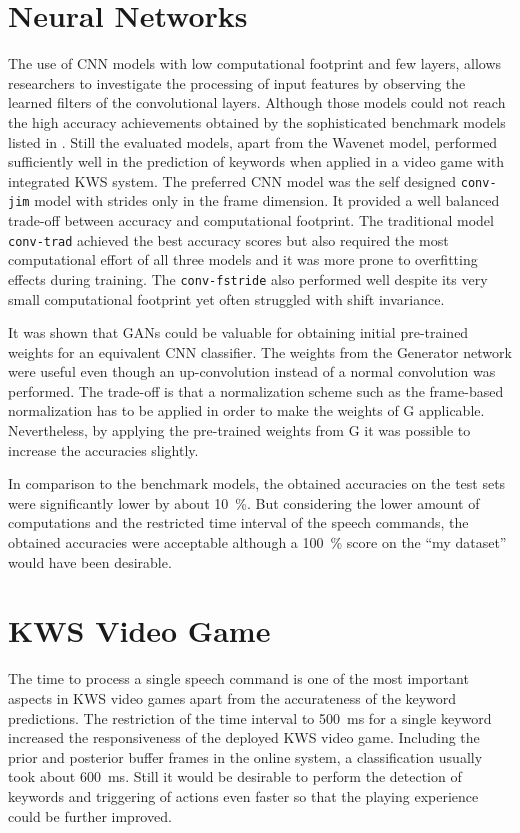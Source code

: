 \section{Neural Networks}
The use of CNN models with low computational footprint and few layers, allows researchers to investigate the processing of input features by observing the learned filters of the convolutional layers.
Although those models could not reach the high accuracy achievements obtained by the sophisticated benchmark models listed in .
Still the evaluated models, apart from the Wavenet model, performed sufficiently well in the prediction of keywords when applied in a video game with integrated KWS system.
The preferred CNN model was the self designed \texttt{conv-jim} model with strides only in the frame dimension.
It provided a well balanced trade-off between accuracy and computational footprint.
The traditional model \texttt{conv-trad} achieved the best accuracy scores but also required the most computational effort of all three models and it was more prone to overfitting effects during training.
The \texttt{conv-fstride} also performed well despite its very small computational footprint yet often struggled with shift invariance.

It was shown that GANs could be valuable for obtaining initial pre-trained weights for an equivalent CNN classifier.
The weights from the Generator network were useful even though an up-convolution instead of a normal convolution was performed.
The trade-off is that a normalization scheme such as the frame-based normalization has to be applied in order to make the weights of G applicable.
Nevertheless, by applying the pre-trained weights from G it was possible to increase the accuracies slightly.

In comparison to the benchmark models, the obtained accuracies on the test sets were significantly lower by about \SI{10}{\percent}.
But considering the lower amount of computations and the restricted time interval of the speech commands, the obtained accuracies were acceptable although a \SI{100}{\percent} score on the \enquote{my dataset} would have been desirable.



\section{KWS Video Game}
The time to process a single speech command is one of the most important aspects in KWS video games apart from the accurateness of the keyword predictions.
The restriction of the time interval to \SI{500}{\milli\second} for a single keyword increased the responsiveness of the deployed KWS video game.
Including the prior and posterior buffer frames in the online system, a classification usually took about \SI{600}{\milli\second}.
Still it would be desirable to perform the detection of keywords and triggering of actions even faster so that the playing experience could be further improved.

